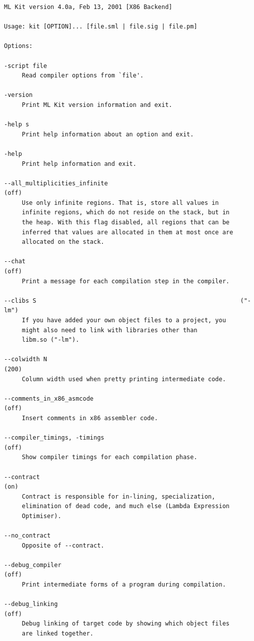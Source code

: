 \documentclass[12pt]{book}
\begin{document}
{\small 
\begin{verbatim}
ML Kit version 4.0a, Feb 13, 2001 [X86 Backend]

Usage: kit [OPTION]... [file.sml | file.sig | file.pm]

Options:

-script file
     Read compiler options from `file'.

-version
     Print ML Kit version information and exit.

-help s
     Print help information about an option and exit.

-help
     Print help information and exit.

--all_multiplicities_infinite                                       (off)
     Use only infinite regions. That is, store all values in
     infinite regions, which do not reside on the stack, but in
     the heap. With this flag disabled, all regions that can be
     inferred that values are allocated in them at most once are
     allocated on the stack.

--chat                                                              (off)
     Print a message for each compilation step in the compiler.

--clibs S                                                         ("-lm")
     If you have added your own object files to a project, you
     might also need to link with libraries other than
     libm.so ("-lm").

--colwidth N                                                        (200)
     Column width used when pretty printing intermediate code.

--comments_in_x86_asmcode                                           (off)
     Insert comments in x86 assembler code.

--compiler_timings, -timings                                        (off)
     Show compiler timings for each compilation phase.

--contract                                                           (on)
     Contract is responsible for in-lining, specialization,
     elimination of dead code, and much else (Lambda Expression
     Optimiser).

--no_contract
     Opposite of --contract.

--debug_compiler                                                    (off)
     Print intermediate forms of a program during compilation.

--debug_linking                                                     (off)
     Debug linking of target code by showing which object files
     are linked together.


\end{verbatim}}
\end{document}
